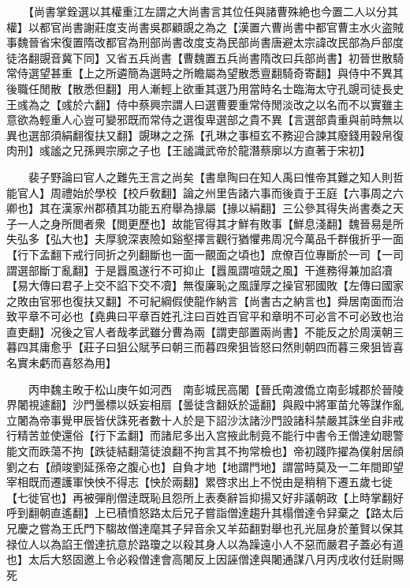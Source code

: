 　　【尚書掌銓選以其權重江左謂之大尚書言其位任與諸曹殊絶也今置二人以分其權】以都官尚書謝莊度支尚書吳郡顧覬之為之【漢置六曹尚書中都官曹主水火盗賊事魏晉省宋復置隋改都官為刑部尚書改度支為民部尚書唐避太宗諱改民部為戶部度徒洛翻覬音冀下同】又省五兵尚書【曹魏置五兵尚書隋改曰兵部尚書】初晉世散騎常侍選望甚重【上之所遴簡為選時之所瞻屬為望散悉亶翻騎奇寄翻】與侍中不異其後職任閒散【散悉但翻】用人漸輕上欲重其選乃用當時名士臨海太守孔覬司徒長史王彧為之【彧於六翻】侍中蔡興宗謂人曰選曹要重常侍閒淡改之以名而不以實雖主意欲為輕重人心豈可變邪既而常侍之選復卑選部之貴不異【言選部貴重與前時無以異也選部須絹翻復扶又翻】覬琳之之孫【孔琳之事桓玄不務迎合諫其廢錢用穀帛復肉刑】彧謐之兄孫興宗廓之子也【王謐識武帝於龍潛蔡廓以方直著于宋初】

　　裴子野論曰官人之難先王言之尚矣【書臯陶曰在知人禹曰惟帝其難之知人則哲能官人】周禮始於學校【校戶敎翻】論之州里告諸六事而後貢于王庭【六事周之六卿也】其在漢家州郡積其功能五府舉為掾屬【掾以絹翻】三公參其得失尚書奏之天子一人之身所閲者衆【閲更歷也】故能官得其才鮮有敗事【鮮息淺翻】魏晉易是所失弘多【弘大也】夫厚貌深衷險如谿壑擇言觀行猶懼弗周况今萬品千群俄折乎一面【行下孟翻下戒行同折之列翻斷也一面一覿面之頃也】庶僚百位專斷於一司【一司謂選部斷丁亂翻】于是囂風遂行不可抑止【囂風謂喧競之風】干進務得兼加諂凟【易大傳曰君子上交不諂下交不凟】無復廉恥之風謹厚之操官邪國敗【左傳曰國家之敗由官邪也復扶又翻】不可紀綱假使龍作納言【尚書古之納言也】舜居南面而治致平章不可必也【堯典曰平章百姓孔注曰百姓百官平和章明不可必言不可必致也治直吏翻】况後之官人者哉孝武雖分曹為兩【謂吏部置兩尚書】不能反之於周漢朝三暮四其庸愈乎【莊子曰狙公賦芧曰朝三而暮四衆狙皆怒曰然則朝四而暮三衆狙皆喜名實未虧而喜怒為用】

　　丙申魏主畋于松山庚午如河西　南彭城民高闍【晉氏南渡僑立南彭城郡於晉陵界闍視遽翻】沙門曇標以妖妄相扇【曇徒含翻妖於遥翻】與殿中將軍苗允等謀作亂立闍為帝事覺甲辰皆伏誅死者數十人於是下詔沙汰諸沙門設諸科禁嚴其誅坐自非戒行精苦並使還俗【行下孟翻】而諸尼多出入宫掖此制竟不能行中書令王僧達幼聰警能文而跌蕩不拘【跌徒結翻蕩徒浪翻不拘言其不拘常檢也】帝初踐阼擢為僕射居顔劉之右【顔竣劉延孫帝之腹心也】自負才地【地謂門地】謂當時莫及一二年間即望宰相既而遷護軍怏怏不得志【怏於兩翻】累啓求出上不悦由是稍稍下遷五歲七徙【七徙官也】再被彈削僧逹既恥且怨所上表奏辭旨抑揚又好非議朝政【上時掌翻好呼到翻朝直遙翻】上已積憤怒路太后兄子嘗詣僧達趨升其榻僧達令舁棄之【路太后兄慶之嘗為王氏門下騶故僧達麾其子舁音余又羊茹翻對舉也孔光屈身於董賢以保其禄位人以為諂王僧達抗意於路瓊之以殺其身人以為躁遠小人不惡而嚴君子蓋必有道也】太后大怒固邀上令必殺僧達會高闍反上因誣僧達與闍通謀八月丙戌收付廷尉賜死

